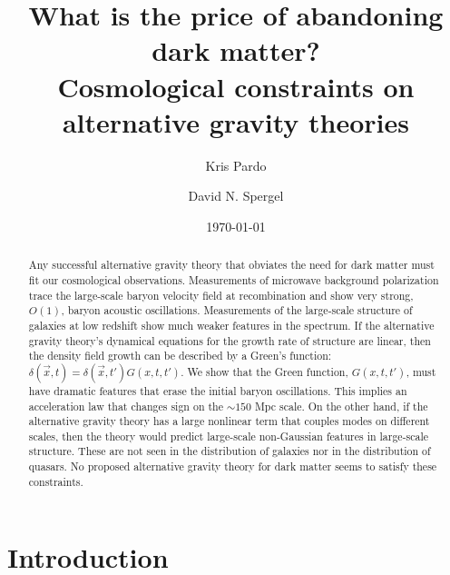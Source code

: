 \documentclass[12pt,floats,floatfix,showpacs,amssymb,amsmath,prl,superscriptaddress,nofootinbib, aps]{revtex4-2}
\begin{document}

\title{What is the price of abandoning dark matter?\\Cosmological constraints on alternative gravity theories}
\author{Kris Pardo}
\author{David N. Spergel}
\date{\today}
\begin{abstract}
Any successful alternative gravity theory that obviates the need for dark matter must fit our cosmological observations. Measurements of microwave background polarization trace the large-scale baryon velocity field at recombination and show very strong, $O(1)$, baryon acoustic oscillations. Measurements of the large-scale structure of galaxies at low redshift show much weaker features in the spectrum. If the alternative gravity theory's dynamical equations for the growth rate of structure are linear, then the density field growth can be described by a Green's function: $\delta(\vec x,t) = \delta(\vec x,t')G(x,t,t')$. We show that the Green function, $G(x,t,t')$, must have dramatic features that erase the initial baryon oscillations. This implies an acceleration law that changes sign on the $\sim 150$ Mpc scale. On the other hand, if the alternative gravity theory has a large nonlinear term that couples modes on different scales, then the theory would predict large-scale non-Gaussian features in large-scale structure. These are not seen in the distribution of galaxies nor in the distribution of quasars. No proposed alternative gravity theory for dark matter seems to satisfy these constraints.
\end{abstract}
\maketitle

\section{Introduction}
\end{document}
